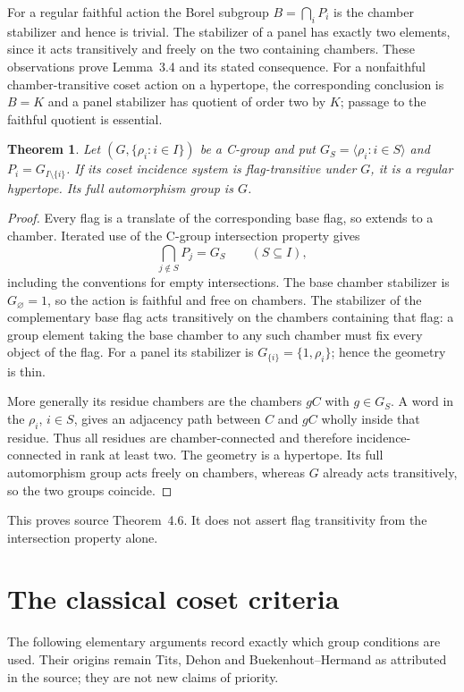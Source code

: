 \documentclass[11pt,a4paper]{article}
\newtheorem{theorem}{Theorem}[section]
\newcommand{\gen}[1]{\langle#1\rangle}
\begin{document}
For a regular faithful action the Borel subgroup
$B=\bigcap_iP_i$ is the chamber stabilizer and hence is trivial.  The
stabilizer of a panel has exactly two elements, since it acts transitively
and freely on the two containing chambers.  These observations prove
Lemma~3.4 and its stated consequence.  For a nonfaithful chamber-transitive
coset action on a hypertope, the corresponding conclusion is $B=K$ and
a panel stabilizer has quotient of order two by $K$; passage to the
faithful quotient is essential.

\begin{theorem}\label{thm:converse}
Let $(G,\{\rho_i:i\in I\})$ be a C-group and put
$G_S=\gen{\rho_i:i\in S}$ and $P_i=G_{I\setminus\{i\}}$.
If its coset incidence system is flag-transitive under $G$, it is a
regular hypertope.  Its full automorphism group is $G$.
\end{theorem}
\begin{proof}
Every flag is a translate of the corresponding base flag, so extends
to a chamber.  Iterated use of the C-group intersection property gives
\[
                  \bigcap_{j\notin S}P_j=G_S
                  \qquad(S\subseteq I),
\]
including the conventions for empty intersections.  The base chamber
stabilizer is $G_\varnothing=1$, so the action is faithful and free
on chambers.  The stabilizer of the complementary base flag acts
transitively on the chambers containing that flag: a group element taking
the base chamber to any such chamber must fix every object of the flag.
For a panel its stabilizer is $G_{\{i\}}=\{1,\rho_i\}$; hence the
geometry is thin.

More generally its residue chambers are the chambers $gC$ with
$g\in G_S$.  A word in the $\rho_i$, $i\in S$, gives an adjacency path
between $C$ and $gC$ wholly inside that residue.  Thus all residues
are chamber-connected and therefore incidence-connected in rank at
least two.  The geometry is a hypertope.  Its full automorphism group
acts freely on chambers, whereas $G$ already acts transitively, so the
two groups coincide.
\end{proof}
This proves source Theorem~4.6.  It does not assert flag transitivity
from the intersection property alone.

\section{The classical coset criteria}

The following elementary arguments record exactly which group conditions
are used.  Their origins remain Tits, Dehon and Buekenhout--Hermand as
attributed in the source; they are not new claims of priority.
\end{document}
